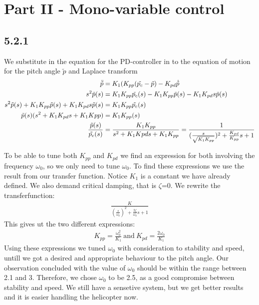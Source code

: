 \section*{Part II - Mono-variable control}

\subsection*{5.2.1}
We substitute in the equation for the PD-controller in to the equation of motion for the pitch angle $\tilde{p}$ and Laplace transform
\begin{align*}
    \ddot{\tilde{p}}                                                    &= K_1(K_{pp}(\tilde{p_c}-\tilde{p})- K_{pd}\dot{\tilde{p}}\\
    s^2\tilde{p}(s)                                                     &= K_1K_{pp}\tilde{p_c}(s)-K_1K_{pp}\tilde{p}(s)-K_1K_{pd}s\tilde{p}(s)\\
    s^2\tilde{p}(s) + K_1K_{pp}\tilde{p}(s) + K_1K_{pd}s\tilde{p}(s)    &= K_1K_{pp}\tilde{p_c}(s)\\
    \tilde{p}(s)(s^2+K_1K_{pd}s + K_1K{pp})                             &= K_1K_{pp}\title{p_c}(s)\\
    \frac{\tilde{p}(s)}{\tilde{p_c}(s)}                                 &= \frac{K_1K_{pp}}{s^2 + K_1K{pd}s + K_1K_{pp}} = \frac{1}{(\frac{s}{\sqrt{K_1K_{pp}}})^2+\frac{K_{pd}}{K_{pp}}s +1}
\end{align*}


To be able to tune both $K_{pp}$ and $K_{pd}$ we find an expression for both involving the frequency $\omega_0$, so we only need to tune $\omega_0$. To find these expressions we use the result from our transfer function. Notice $K_1$ is a constant we have already defined. We also demand critical damping, that is $\zeta$=0. We rewrite the transferfunction: 
\begin{align*}
\frac{K}{(\frac{s}{\omega_0})^2+\frac{2\zeta}{\omega_0}s +1}
\end{align*} 
This gives ut the two different expressions: 
\begin{align*}
K_{pp} = \frac{\omega_0^2}{K_1}\ \text{and}\  K_{pd} = \frac{2\omega_0}{K_1}
\end{align*}
Using these expressions we tuned $\omega_0$ with consideration to stability and speed, untill we got a desired and appropriate behaviour to the pitch angle. Our observation concluded with the value of $\omega_0$ should be within the range between 2.1 and 3. Therefore, we chose $\omega_0$ to be 2.5, as a good compromise between stability and speed. We still have a sensetive system, but we get better results and it is easier handling the helicopter now. 


